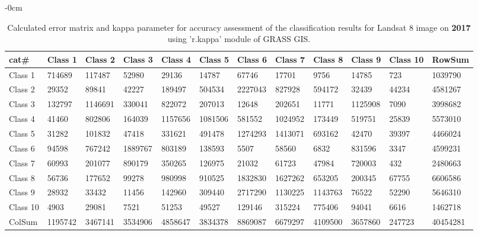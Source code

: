 \documentclass[sustainability,article,submit,pdftex,moreauthors]{Definitions/mdpi}
\begin{document}
\begin{table}[H] 
\footnotesize
    \centering
    \begin{adjustwidth}{-\extralength}{0cm}
    \caption{Calculated error matrix and kappa parameter for accuracy assessment of the classification results for Landsat 8 image on \textbf{2017} using 'r.kappa' module of GRASS GIS.\label{tab03}}
 	\begin{tabularx}{\fulllength}{|l|l|l|l|l|l|l|l|l|l|l|l|}
    \toprule
        cat\# & \textbf{Class 1} & \textbf{Class 2} & \textbf{Class 3} & \textbf{Class 4} & \textbf{Class 5} & \textbf{Class 6} & \textbf{Class 7} & \textbf{Class 8} & \textbf{Class 9} & \textbf{Class 10} & \textbf{RowSum} \\ \hline
        Class 1 & \cellcolor{green!20}714689 & 117487 & 52980 & 29136 & 14787 & 67746 & 17701 & 9756 & 14785 & 723 & 1039790 \\ \hline
        Class 2 & 29352 & \cellcolor{green!20}89841 & 42227 & 189497 & 504534 & 2227043 & 827928 & 594172 & 32439 & 44234 & 4581267 \\ \hline
        Class 3 & 132797 & 1146691 & \cellcolor{green!20}330041 & 822072 & 207013 & 12648 & 202651 & 11771 & 1125908 & 7090 & 3998682 \\ \hline
        Class 4 & 41460 & 802806 & 164039 & \cellcolor{green!20}1157656 & 1081506 & 581552 & 1024952 & 173449 & 519751 & 25839 & 5573010 \\ \hline
        Class 5 & 31282 & 101832 & 47418 & 331621 & \cellcolor{green!20}491478 & 1274293 & 1413071 & 693162 & 42470 & 39397 & 4466024 \\ \hline
        Class 6 & 94598 & 767242 & 1889767 & 803189 & 138593 & \cellcolor{green!20}5507 & 58560 & 6832 & 831596 & 3347 & 4599231 \\ \hline
        Class 7 & 60993 & 201077 & 890179 & 350265 & 126975 & 21032 & \cellcolor{green!20}61723 & 47984 & 720003 & 432 & 2480663 \\ \hline
        Class 8 & 56736 & 177652 & 99278 & 980998 & 910525 & 1832830 & 1627262 & \cellcolor{green!20}653205 & 200345 & 67755 & 6606586 \\ \hline
        Class 9 & 28932 & 33432 & 11456 & 142960 & 309440 & 2717290 & 1130225 & 1143763 & \cellcolor{green!20}76522 & 52290 & 5646310 \\ \hline
        Class 10 & 4903 & 29081 & 7521 & 51253 & 49527 & 129146 & 315224 & 775406 & 94041 & \cellcolor{green!20}6616 & 1462718 \\ \hline
        ColSum & 1195742 & 3467141 & 3534906 & 4858647 & 3834378 & 8869087 & 6679297 & 4109500 & 3657860 & 247723 & \cellcolor{green!20}40454281 \\ \hline
        \bottomrule
    \end{tabularx}
    \end{adjustwidth}
\end{table}
\end{document}

